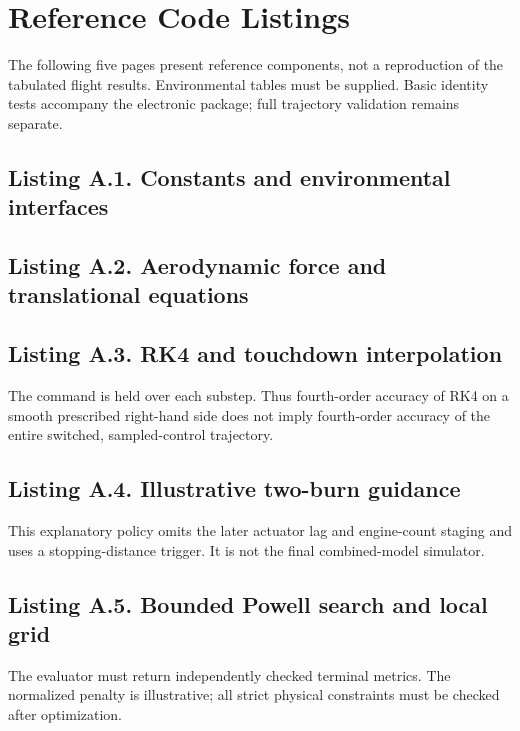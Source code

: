 \documentclass[11pt,a4paper]{article}
\begin{document}
\clearpage
\appendix
\section{Reference Code Listings}
\label{app:code}
\noindent The following five pages present reference components, not a reproduction of the tabulated flight results. Environmental tables must be supplied. Basic identity tests accompany the electronic package; full trajectory validation remains separate.
\subsection*{Listing A.1. Constants and environmental interfaces}

\clearpage
\subsection*{Listing A.2. Aerodynamic force and translational equations}

\clearpage
\subsection*{Listing A.3. RK4 and touchdown interpolation}

\noindent\small The command is held over each substep. Thus fourth-order accuracy of RK4 on a smooth prescribed right-hand side does not imply fourth-order accuracy of the entire switched, sampled-control trajectory.
\clearpage
\subsection*{Listing A.4. Illustrative two-burn guidance}

\noindent\small This explanatory policy omits the later actuator lag and engine-count staging and uses a stopping-distance trigger. It is not the final combined-model simulator.
\clearpage
\subsection*{Listing A.5. Bounded Powell search and local grid}

\noindent\small The evaluator must return independently checked terminal metrics. The normalized penalty is illustrative; all strict physical constraints must be checked after optimization.
\normalsize
\end{document}
